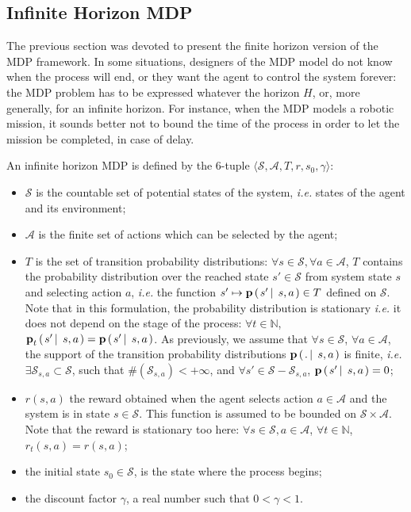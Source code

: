 \subsection{Infinite Horizon MDP} \label{subsectionIHMDP}
The previous section was devoted to present 
the finite horizon version of the MDP framework.
In some situations, designers of the MDP model
do not know when the process will end,
or they want the agent to control the system forever: 
the MDP problem has to be expressed whatever the horizon $H$,
or, more generally, for an infinite horizon.
For instance, when the MDP models a robotic mission,
it sounds better not to bound the time of the process
in order to let the mission be completed, 
in case of delay.

An infinite horizon MDP 
is defined by the $6$-tuple 
$\langle \mathcal{S},\mathcal{A},T,r,s_0,\gamma \rangle$:
\begin{itemize}
\item $\mathcal{S}$ is the countable set of potential states of the system, 
\textit{i.e.} states of the agent and its environment;
\item $\mathcal{A}$ is the finite set of actions 
which can be selected by the agent;
\item $T$ is the set of transition probability distributions:
$ \forall s \in \mathcal{S}, \forall a \in \mathcal{A}$,
$T$ contains the probability distribution over the reached state $s' \in \mathcal{S}$
from system state $s$ and selecting action $a$,
\textit{i.e.}
the function $s' \mapsto \textbf{p} \left( \left.  s' \, \right| \left. \, s,a \right. \right) \in T$ 
defined on $\mathcal{S}$.
Note that in this formulation,
the probability distribution is stationary
\textit{i.e.} it does not depend on the stage of the process:	
$\forall t \in \mathbb{N}$, $\textbf{p}_t \left( \left.  s' \, \right| \left. \, s,a \right. \right) = \textbf{p} \left( \left.  s' \, \right| \left. \, s,a \right. \right) $.
As previously, we assume that 
$\forall s \in \mathcal{S}$, $\forall a \in \mathcal{A}$, 
the support of the transition probability distributions 
$\mathbf{p} \left( \left.  . \, \right| \left. \, s,a  \right. \right)$ is finite, 
\textit{i.e.} $\exists \mathcal{S}_{s,a} \subset \mathcal{S}$, such that
$\# (\mathcal{S}_{s,a})< +\infty$, 
and $\forall s' \in \mathcal{S} - \mathcal{S}_{s,a}$, 
$\textbf{p} \left( \left.  s' \, \right| \left. \, s,a \right. \right)=0$;
\item $r(s,a)$ the reward obtained when the agent
selects action $a \in \mathcal{A}$
and the system is in state $s \in \mathcal{S}$.
This function is assumed to be bounded
on $\mathcal{S} \times \mathcal{A}$.
Note that the reward is stationary too here:
$\forall s \in \mathcal{S}, a \in \mathcal{A}$, 
$\forall t \in \mathbb{N}$,
$r_t(s,a) = r(s,a)$;
\item the initial state $s_0 \in \mathcal{S}$,
is the state where the process begins;
\item the discount factor $\gamma$, 
a real number such that $0<\gamma<1$.
\end{itemize}
